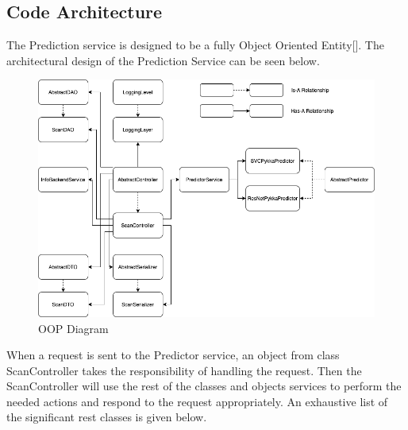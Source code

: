 		\subsection{Code Architecture}
			The Prediction service is designed to be a fully Object Oriented Entity[\cite{oop}].
			The architectural design of the Prediction Service can be seen below.\pagebreak
			\begin{figure}[H]
				\iftrue
				\caption{OOP Diagram}
				\centering
				\includegraphics[angle=90,origin=c,scale=0.7]{figures/PredictorServiceCodeDiagram}
				\fi
			\end{figure}\pagebreak
			When a request is sent to the Predictor service, an object from class ScanController takes the responsibility 
			of handling the request. Then the ScanController will use the rest of the classes and objects services to perform
			 the needed actions and respond to the request appropriately. An exhaustive list of the significant rest classes is 
			 given below.
